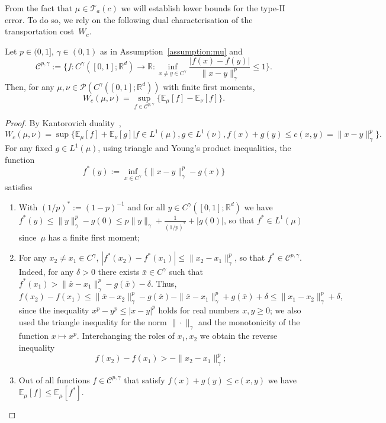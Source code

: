 \documentclass[twoside,11pt]{article}
\numberwithin{equation}{section}
\numberwithin{theorem}{section}
\newcommand{\R}{\mathbb{R}}
\newcommand{\ex}{\mathbb{E}}
\newcommand{\Cc}{\mathscr{C}}
\begin{document}
\noindent From the fact that $\mu\in\mathscr{T}_a(c)$ we will establish lower bounds for the type-$\mathrm{II}$ error. 
To do so, we rely on the following dual characterisation of the transportation cost~$W_c$.
\begin{lemma}\label{lem:Wcdual} Let $p\in(0,1]$, $\gamma\in(0,1)$ as in Assumption~\ref{assumption:mu} and 
$$
\Cc^{p,\gamma}:=\bigg\{ f: C^\gamma([0,1];\R^d)\rightarrow\R: \inf_{x\neq y\in C^\gamma}\frac{|f(x)-f(y)|}{\|x-y\|^p_\gamma}\leq 1   \bigg\}.$$
Then, for any $\mu, \nu\in \mathscr{P}(C^\gamma([0,1];\R^d))$ with finite first moments,
\begin{equation*}
W_c(\mu, \nu) = \sup_{f\in \Cc^{p,\gamma} }\bigg\{\ex_{\mu}[f]-\ex_{\nu}[f]\bigg\}.
\end{equation*}
\end{lemma}
\begin{proof} By Kantorovich duality~\cite[Theorem 2.2]{gozlan2010transport},
$$W_c(\mu,\nu)=\sup\bigg\{   \ex_\mu[f]+\ex_\nu[g] \bigg| f\in L^1(\mu), g\in L^1(\nu), f(x)+g(y)\leq c(x,y)=\|x-y\|^p_{\gamma}\bigg\}.        $$
For any  fixed $g\in L^1(\mu)$, 
using triangle and Young's product inequalities, the function 
$$
f^*(y) := \inf_{x\in C^\gamma}\bigg\{ \|x-y\|^p_{\gamma}-g(x) \bigg\}$$
satisfies
\begin{enumerate}
\item With $(1/p)^*:=(1-p)^{-1}$ and for all $y\in C^\gamma([0,1];\R^d)$ we have $f^*(y)\leq \|y\|^p_{\gamma}-g(0)\leq p\|y\|_\gamma+\frac{1}{(1/p)^*}+|g(0)|$, so that $f^*\in L^1(\mu)$ since~$\mu$ has a finite first moment;
\item For any $x_2\neq x_1\in C^\gamma$, $|f^*(x_2)-f^*(x_1)|\leq \|x_2-x_1\|^p_\gamma$, so that $f^*\in \Cc^{p,\gamma}$. 
Indeed, for any $\delta>0$ there exists $\bar{x}\in C^\gamma$ such that 
$f^*(x_1)>\|\bar{x}-x_1\|_{\gamma}^p-g(\bar{x})-\delta$.
Thus, 
$$
f(x_2)-f(x_1)\leq 
\|\bar{x}-x_2\|_{\gamma}^p - g(\bar{x}) - \|\bar{x}-x_1\|_{\gamma}^p + g(\bar{x})+\delta\leq \|x_1-x_2\|_{\gamma}^p+\delta,
$$
since the inequality $x^p-y^p\leq |x-y|^p$ holds for real numbers $x,y\geq 0$; we also used the triangle inequality for the norm $\|\cdot\|_\gamma$ and the monotonicity of the function $x\mapsto x^p.$ Interchanging the roles of $x_1, x_2$ we obtain the reverse inequality 
$$ f(x_2)-f(x_1)>-\|x_2-x_1\|^p_\gamma;$$
\item Out of all functions $f\in\mathscr{C}^{p,\gamma}$ that satisfy $f(x)+g(y)\leq c(x,y)$ we have
$\ex_\mu[f]\leq \ex_\mu[f^*]$.
\end{enumerate}

\end{proof}
\end{document}
